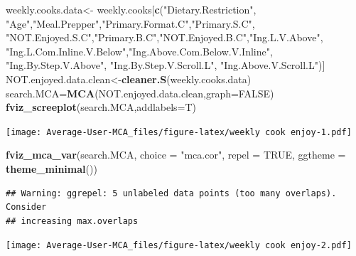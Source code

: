 \documentclass[
]{article}
\newenvironment{Shaded}{\begin{snugshade}}{\end{snugshade}}
\newcommand{\DataTypeTok}[1]{\textcolor[rgb]{0.13,0.29,0.53}{#1}}
\newcommand{\KeywordTok}[1]{\textcolor[rgb]{0.13,0.29,0.53}{\textbf{#1}}}
\newcommand{\NormalTok}[1]{#1}
\newcommand{\OtherTok}[1]{\textcolor[rgb]{0.56,0.35,0.01}{#1}}
\newcommand{\StringTok}[1]{\textcolor[rgb]{0.31,0.60,0.02}{#1}}
\begin{document}
\begin{Shaded}
\begin{Highlighting}[]
\NormalTok{weekly.cooks.data<-}\StringTok{ }\NormalTok{weekly.cooks[}\KeywordTok{c}\NormalTok{(}\StringTok{"Dietary.Restriction"}\NormalTok{, }\StringTok{"Age"}\NormalTok{,}\StringTok{"Meal.Prepper"}\NormalTok{,}\StringTok{"Primary.Format.C"}\NormalTok{,}\StringTok{"Primary.S.C"}\NormalTok{,}
            \StringTok{"NOT.Enjoyed.S.C"}\NormalTok{,}\StringTok{"Primary.B.C"}\NormalTok{,}\StringTok{"NOT.Enjoyed.B.C"}\NormalTok{,}\StringTok{"Ing.L.V.Above"}\NormalTok{,}
            \StringTok{"Ing.L.Com.Inline.V.Below"}\NormalTok{,}\StringTok{"Ing.Above.Com.Below.V.Inline"}\NormalTok{,  }\StringTok{"Ing.By.Step.V.Above"}\NormalTok{,  }\StringTok{"Ing.By.Step.V.Scroll.L"}\NormalTok{,}
            \StringTok{"Ing.Above.V.Scroll.L"}\NormalTok{)]}
\NormalTok{NOT.enjoyed.data.clean<-}\KeywordTok{cleaner.S}\NormalTok{(weekly.cooks.data)}
\NormalTok{search.MCA=}\KeywordTok{MCA}\NormalTok{(NOT.enjoyed.data.clean,}\DataTypeTok{graph=}\OtherTok{FALSE}\NormalTok{)}
\KeywordTok{fviz_screeplot}\NormalTok{(search.MCA,}\DataTypeTok{addlabels=}\NormalTok{T)}
\end{Highlighting}
\end{Shaded}

\texttt{[image: Average-User-MCA\_files/figure-latex/weekly cook enjoy-1.pdf]}

\begin{Shaded}
\begin{Highlighting}[]
\KeywordTok{fviz_mca_var}\NormalTok{(search.MCA, }\DataTypeTok{choice =} \StringTok{"mca.cor"}\NormalTok{, }\DataTypeTok{repel =} \OtherTok{TRUE}\NormalTok{,}
             \DataTypeTok{ggtheme =} \KeywordTok{theme_minimal}\NormalTok{())}
\end{Highlighting}
\end{Shaded}

\begin{verbatim}
## Warning: ggrepel: 5 unlabeled data points (too many overlaps). Consider
## increasing max.overlaps
\end{verbatim}

\texttt{[image: Average-User-MCA\_files/figure-latex/weekly cook enjoy-2.pdf]}

\begin{Shaded}
\end{Shaded}
\end{document}
